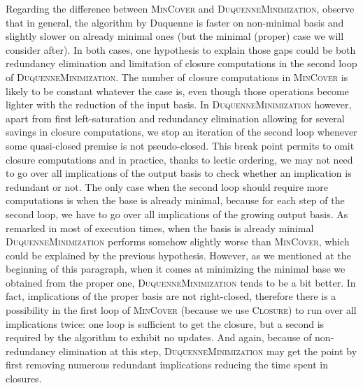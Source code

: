 Regarding the difference between \textsc{MinCover} and \textsc{DuquenneMinimization}, observe that in general, the algorithm by Duquenne is faster on non-minimal basis and slightly slower on already minimal ones (but the minimal (proper) case we will consider after). In both cases, one hypothesis to explain those gaps could be both redundancy elimination and limitation of closure computations in the second loop of \textsc{DuquenneMinimization}. The number of closure computations in \textsc{MinCover} is likely to be constant whatever the case is, even though
those operations become lighter with the reduction of the input basis. In \textsc{DuquenneMinimization} however, apart from first left-saturation and
redundancy elimination allowing for several savings in closure computations, we stop an iteration of the second loop whenever some quasi-closed premise is not
pseudo-closed. This break point permits to omit closure computations and in practice, thanks to lectic ordering, we may not need to go over all implications of the output basis to check whether an implication is redundant or not. The only case when the second loop should require more computations is when the base is already minimal, because for each step of the second loop, we have to go over all implications of the growing output basis. As remarked in most of execution times, when the basis is already minimal \textsc{DuquenneMinimization} performs somehow slightly worse than 
\textsc{MinCover}, which could be explained by the previous hypothesis. However,
as we mentioned at the beginning of this paragraph, when it comes at minimizing
the minimal base we obtained from the proper one, \textsc{DuquenneMinimization}
tends to be a bit better. In fact, implications of the proper basis are not
right-closed, therefore there is a possibility in the first loop of \textsc{MinCover} (because we use \textsc{Closure}) to run over all implications
twice: one loop is sufficient to get the closure, but a second is required by the algorithm to exhibit no updates. And again, because of non-redundancy elimination at this step, \textsc{DuquenneMinimization} may get the point by first removing numerous redundant implications reducing the time spent in closures.

\vspace{1.2em}

